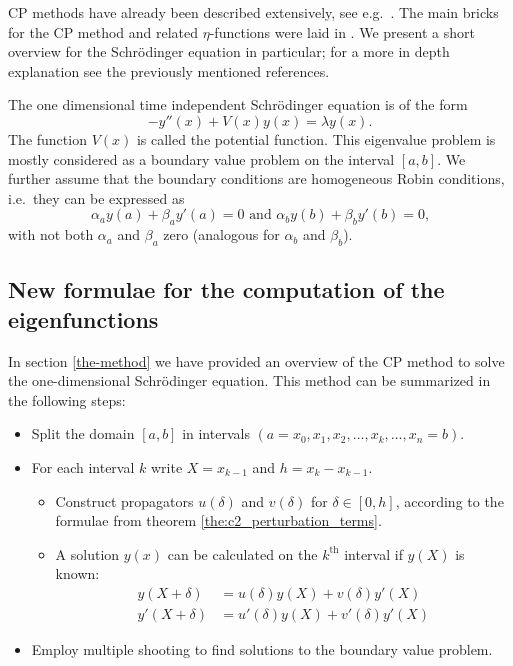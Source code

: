 CP methods have already been described extensively, see e.g.\ \cite{ixaru_numerical_1984,ixaru_cp_1998,ixaru_cp_2000,ledoux_cp_2004}. The main bricks for the CP method and related $\eta$-functions were laid in \cite{ixaru_numerical_1984}. We present a short overview for the Schrödinger equation in particular; for a more in depth explanation see the previously mentioned references.

The one dimensional time independent Schrödinger equation is of the form
$$
    -y''(x) + V(x)y(x) = \lambda y(x)\text{.}
$$
The function $V(x)$ is called the potential function. This eigenvalue problem is mostly considered as a boundary value problem on the interval $[a, b]$. We further assume that the boundary conditions are homogeneous Robin conditions, i.e.~they can be expressed as
$$
    \alpha_a y(a) + \beta_a y'(a) = 0 \text{ and } \alpha_b y(b) + \beta_b y'(b) = 0\text{,}
$$
with not both $\alpha_a$ and $\beta_a$ zero (analogous for $\alpha_b$ and $\beta_b$).


\subsection{New formulae for the computation of the eigenfunctions}\label{sec:c2_cp_in_delta}

In section \ref{the-method} we have provided an overview of the CP method to solve the one-dimensional Schrödinger equation. This method can be summarized in the following steps:
\begin{itemize}
    \item Split the domain $[a, b]$ in intervals $(a=x_0, x_1, x_2, \dots, x_k, \dots, x_n = b)$.
    \item For each interval $k$ write $X = x_{k-1}$ and $h = x_k - x_{k-1}$. \begin{itemize}
              \item Construct propagators $u(\delta)$ and $v(\delta)$ for $\delta \in [0, h]$, according to the formulae from theorem \ref{the:c2_perturbation_terms}.
              \item A solution $y(x)$ can be calculated on the $k^\text{th}$ interval if $y(X)$ is known:
                    \begin{align*}
                        y(X+\delta)  & = u(\delta)y(X) + v(\delta)y'(X)   \\
                        y'(X+\delta) & = u'(\delta)y(X) + v'(\delta)y'(X)
                    \end{align*}
          \end{itemize}
    \item Employ multiple shooting to find solutions to the boundary value problem.
\end{itemize}

